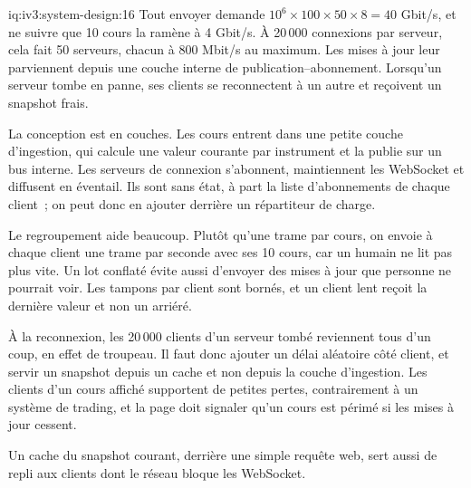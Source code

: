 \begin{solution}{iq:iv3:system-design:16}
Tout envoyer demande $10^6 \times 100 \times 50 \times 8 = 40$ Gbit/s, et ne suivre que 10 cours la ramène à 4 Gbit/s. À 20\,000 connexions par serveur, cela fait 50 serveurs, chacun à 800 Mbit/s au maximum. Les mises à jour leur parviennent depuis une couche interne de publication--abonnement. Lorsqu'un serveur tombe en panne, ses clients se reconnectent à un autre et reçoivent un snapshot frais.

La conception est en couches. Les cours entrent dans une petite couche d'ingestion, qui calcule une valeur courante par instrument et la publie sur un bus interne. Les serveurs de connexion s'abonnent, maintiennent les WebSocket et diffusent en éventail. Ils sont sans état, à part la liste d'abonnements de chaque client~; on peut donc en ajouter derrière un répartiteur de charge.

Le regroupement aide beaucoup. Plutôt qu'une trame par cours, on envoie à chaque client une trame par seconde avec ses 10 cours, car un humain ne lit pas plus vite. Un lot conflaté évite aussi d'envoyer des mises à jour que personne ne pourrait voir. Les tampons par client sont bornés, et un client lent reçoit la dernière valeur et non un arriéré.

À la reconnexion, les 20\,000 clients d'un serveur tombé reviennent tous d'un coup, en effet de troupeau. Il faut donc ajouter un délai aléatoire côté client, et servir un snapshot depuis un cache et non depuis la couche d'ingestion. Les clients d'un cours affiché supportent de petites pertes, contrairement à un système de trading, et la page doit signaler qu'un cours est périmé si les mises à jour cessent.

Un cache du snapshot courant, derrière une simple requête web, sert aussi de repli aux clients dont le réseau bloque les WebSocket.

\end{solution}

